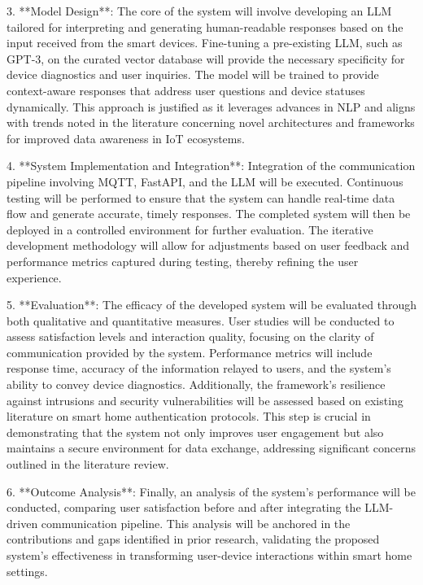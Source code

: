 \documentclass[conference]{IEEEtran}
\begin{document}
3. **Model Design**: 
   The core of the system will involve developing an LLM tailored for interpreting and generating human-readable responses based on the input received from the smart devices. Fine-tuning a pre-existing LLM, such as GPT-3, on the curated vector database will provide the necessary specificity for device diagnostics and user inquiries. The model will be trained to provide context-aware responses that address user questions and device statuses dynamically. This approach is justified as it leverages advances in NLP and aligns with trends noted in the literature concerning novel architectures and frameworks for improved data awareness in IoT ecosystems.

4. **System Implementation and Integration**: 
   Integration of the communication pipeline involving MQTT, FastAPI, and the LLM will be executed. Continuous testing will be performed to ensure that the system can handle real-time data flow and generate accurate, timely responses. The completed system will then be deployed in a controlled environment for further evaluation. The iterative development methodology will allow for adjustments based on user feedback and performance metrics captured during testing, thereby refining the user experience.

5. **Evaluation**: 
   The efficacy of the developed system will be evaluated through both qualitative and quantitative measures. User studies will be conducted to assess satisfaction levels and interaction quality, focusing on the clarity of communication provided by the system. Performance metrics will include response time, accuracy of the information relayed to users, and the system's ability to convey device diagnostics. Additionally, the framework's resilience against intrusions and security vulnerabilities will be assessed based on existing literature on smart home authentication protocols. This step is crucial in demonstrating that the system not only improves user engagement but also maintains a secure environment for data exchange, addressing significant concerns outlined in the literature review.

6. **Outcome Analysis**: 
   Finally, an analysis of the system's performance will be conducted, comparing user satisfaction before and after integrating the LLM-driven communication pipeline. This analysis will be anchored in the contributions and gaps identified in prior research, validating the proposed system's effectiveness in transforming user-device interactions within smart home settings.
\end{document}
